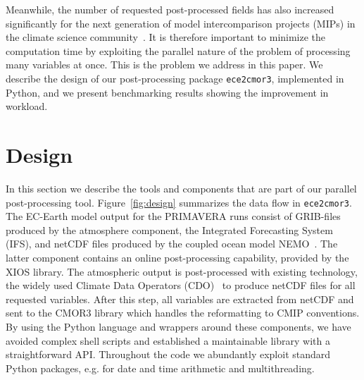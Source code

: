 \documentclass[procedia]{easychair}
\begin{document}
Meanwhile, the number of requested post-processed fields has also increased significantly for the next generation of model intercomparison projects (MIPs) in the climate 
science community~\cite{eyri:2016b}.
It is therefore important to minimize the 
computation time by 
exploiting the parallel nature of the problem of processing many variables at once.
This is the problem we address in this paper.  
We describe the design of our post-processing package \texttt{ece2cmor3}, implemented in Python, and 
we present benchmarking results showing the improvement in workload. 


\section{Design}

In this section we describe the tools and components that 
are part of our parallel post-processing tool. Figure~\ref{fig:design} summarizes the data flow in \texttt{ece2cmor3}. 
% 
The EC-Earth model output for the PRIMAVERA runs consist of GRIB-files produced 
by the atmosphere component, the Integrated Forecasting System (IFS), and 
netCDF files produced by the coupled ocean model NEMO~\cite{NEMO}. The latter 
component 
contains an online post-processing capability, provided by the XIOS library. The 
atmospheric output is post-processed with existing technology, the widely used 
Climate Data Operators (CDO)~\cite{CDO} to produce netCDF files for all 
requested 
variables. After this step, all variables are extracted from netCDF and sent to 
the CMOR3 library \cite{CMOR} which handles the reformatting to CMIP 
conventions. By using the 
Python language and wrappers around these components, we have avoided 
complex shell scripts and established a maintainable library with a 
straightforward API. Throughout the code we abundantly exploit standard Python 
packages, e.g. for date and time arithmetic and multithreading.
\end{document}
